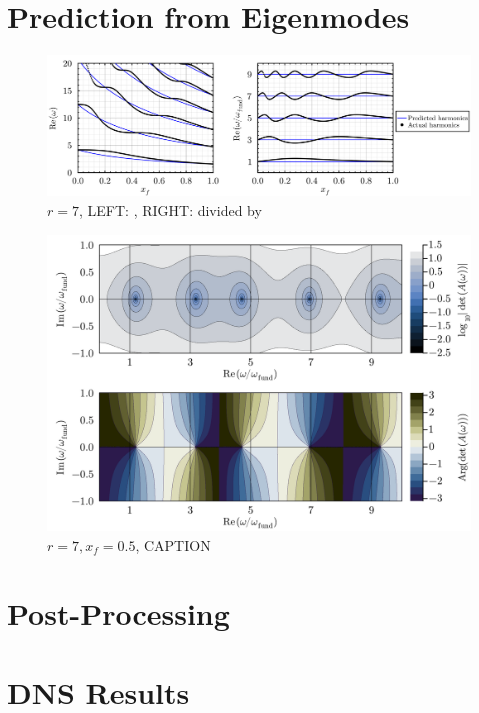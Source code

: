 \section{Prediction from Eigenmodes}


\begin{figure}[t]
\centering
\includegraphics[scale=0.35]{assets/graphs/r=7_harmonics_both.pdf}
\caption{$r = 7$, LEFT: , RIGHT: divided by }
\label{fig:flame-harmonics}
\end{figure}
    
\begin{figure}[t]
\centering
\includegraphics[scale=0.35]{assets/graphs/r=7_xf=05_complex_harmonics.pdf}
\caption{$r = 7, x_f = 0.5$, CAPTION}
\label{fig:flame-harmonics-complex}
\end{figure}
    
    


\section{Post-Processing}



\section{DNS Results}

